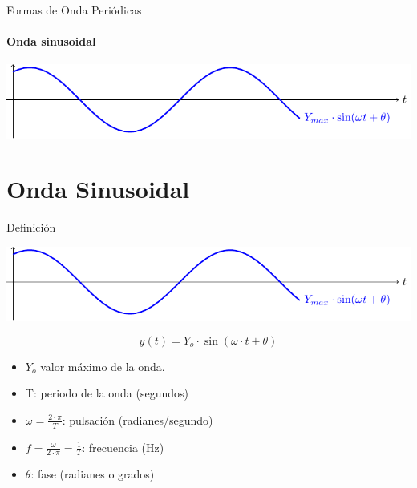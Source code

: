 \documentclass[aspectratio=169, usenames,svgnames,dvipsnames]{beamer}
\begin{document}
\begin{frame}[label={sec:org9b69f99}]{Formas de Onda Periódicas}
\framesubtitle{Onda sinusoidal}

\begin{center}
\includegraphics[width=.9\linewidth]{../figs/sin.pdf}
\end{center}
\end{frame}

\section{Onda Sinusoidal}
\label{sec:org7bcf962}

\begin{frame}[label={sec:org7a5e661}]{Definición}
\begin{center}
\includegraphics[width=.9\linewidth]{../figs/sin.pdf}
\end{center}


\[
y(t)=Y_{o}\cdot\sin(\omega\cdot t+\theta)
\]

\begin{itemize}
\item \(Y_{o}\) valor máximo de la onda.

\item T: periodo de la onda (segundos)

\item \(\omega=\frac{2\cdot\pi}{T}\): pulsación (radianes/segundo)

\item \(f=\frac{\omega}{2\cdot\pi}=\frac{1}{T}\): frecuencia (Hz)

\item \(\theta\): fase (radianes o grados)
\end{itemize}
\end{frame}
\end{document}
